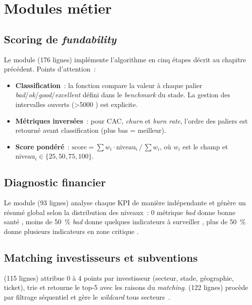 \section{Modules métier}

\subsection{Scoring de \textit{fundability}}

Le module  (176 lignes) implémente l'algorithme en cinq étapes décrit au chapitre précédent. Points d'attention~:

\begin{itemize}
  \item \textbf{Classification}~: la fonction  compare la valeur à chaque palier \textit{bad}/\textit{ok}/\textit{good}/\textit{excellent} défini dans le \textit{benchmark} du stade. La gestion des intervalles ouverts (\og \textgreater 5000 \fg) est explicite.
  \item \textbf{Métriques inversées}~: pour \ac{CAC}, \textit{churn} et \textit{burn rate}, l'ordre des paliers est retourné avant classification (plus bas = meilleur).
  \item \textbf{Score pondéré}~: $\text{score} = \sum w_i \cdot \text{niveau}_i \,/\, \sum w_i$, où $w_i$ est le champ  et $\text{niveau}_i \in \{25, 50, 75, 100\}$.
\end{itemize}

\subsection{Diagnostic financier}

Le module  (93 lignes) analyse chaque \ac{KPI} de manière indépendante et génère un résumé global selon la distribution des niveaux~: 0 métrique \textit{bad} donne \og bonne santé \fg, moins de 50~\% \textit{bad} donne \og quelques indicateurs à surveiller \fg, plus de 50~\% donne \og plusieurs indicateurs en zone critique \fg.

\subsection{Matching investisseurs et subventions}

 (115 lignes) attribue 0 à 4 points par investisseur (secteur, stade, géographie, ticket), trie et retourne le top-5 avec les raisons du \textit{matching}.  (122 lignes) procède par filtrage séquentiel et gère le \textit{wildcard} \og tous secteurs~\fg.

